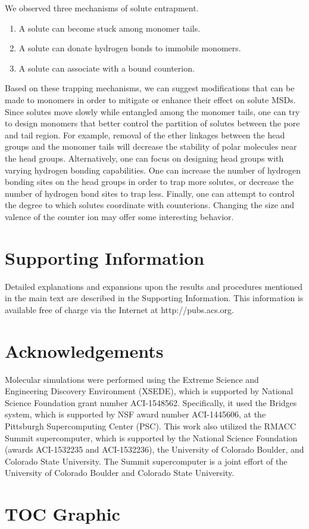 \documentclass[journal=jpcbfk,manuscript=article]{achemso}
\begin{document}
  We observed three mechanisms of solute entrapment.
  \begin{enumerate}
    \item A solute can become stuck among monomer tails. 
    \item A solute can donate hydrogen bonds to immobile monomers.
    \item A solute can associate with a bound counterion.
  \end{enumerate}
  
  Based on these trapping mechanisms, we can suggest modifications that
  can be made to monomers in order to mitigate or enhance their effect on
  solute MSDs. Since solutes move slowly while entangled among the monomer
  tails, one can try to design monomers that better control the partition
  of solutes between the pore and tail region. For example, removal of the 
  ether linkages between the head groups and the monomer tails will decrease
  the stability of polar molecules near the head groups. Alternatively, one
  can focus on designing head groups with varying hydrogen bonding capabilities.
  One can increase the number of hydrogen bonding sites on the head groups
  in order to trap more solutes, or decrease the number of hydrogen bond sites
  to trap less. Finally, one can attempt to control the degree to which solutes
  coordinate with counterions. Changing the size and valence of the counter 
  ion may offer some interesting behavior. 

  \section{Supporting Information}

  Detailed explanations and expansions upon the results and procedures mentioned in
  the main text are described in the Supporting Information. This information is
  available free of charge via the Internet at http://pubs.acs.org.

  \section{Acknowledgements}

  Molecular simulations were performed using the Extreme Science and
  Engineering Discovery Environment (XSEDE), which is supported by National
  Science Foundation grant number ACI-1548562. Specifically, it used the Bridges
  system, which is supported by NSF award number ACI-1445606, at the Pittsburgh
  Supercomputing Center (PSC). This work also utilized the RMACC Summit supercomputer,
  which is supported by the National Science Foundation (awards ACI-1532235 and
  ACI-1532236), the University of Colorado Boulder, and Colorado State
  University. The Summit supercomputer is a joint effort of the University of
  Colorado Boulder and Colorado State University.

  \clearpage

  
  

  \newpage

  \section{TOC Graphic}
\end{document}
